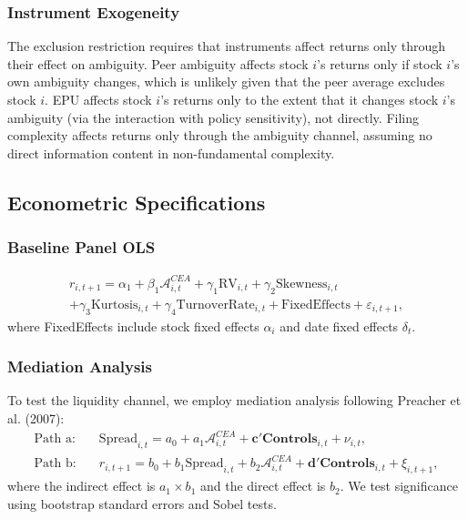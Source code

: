 \documentclass[preprint,12pt,authoryear]{elsarticle}
\begin{document}
\subsubsection{Instrument Exogeneity}
The exclusion restriction requires that instruments affect returns only through their effect on ambiguity. Peer ambiguity affects stock $i$'s returns only if stock $i$'s own ambiguity changes, which is unlikely given that the peer average excludes stock $i$. EPU affects stock $i$'s returns only to the extent that it changes stock $i$'s ambiguity (via the interaction with policy sensitivity), not directly. Filing complexity affects returns only through the ambiguity channel, assuming no direct information content in non-fundamental complexity.

\subsection{Econometric Specifications}

\subsubsection{Baseline Panel OLS}
\begin{equation}
\begin{split}
r_{i,t+1} = \alpha_1 + \beta_1 \mathcal{A}^{CEA}_{i,t} + \gamma_1 \text{RV}_{i,t} + \gamma_2 \text{Skewness}_{i,t} \\
+ \gamma_3 \text{Kurtosis}_{i,t} + \gamma_4 \text{TurnoverRate}_{i,t} + \text{FixedEffects} + \varepsilon_{i,t+1},
\end{split}
\end{equation}
where FixedEffects include stock fixed effects $\alpha_i$ and date fixed effects $\delta_t$.

\subsubsection{Mediation Analysis}
To test the liquidity channel, we employ mediation analysis following Preacher et al. (2007):
\begin{align}
\text{Path a:}\quad & \text{Spread}_{i,t} = a_0 + a_1 \mathcal{A}^{CEA}_{i,t} + \mathbf{c}'\mathbf{Controls}_{i,t} + \nu_{i,t}, \\
\text{Path b:}\quad & r_{i,t+1} = b_0 + b_1 \text{Spread}_{i,t} + b_2 \mathcal{A}^{CEA}_{i,t} + \mathbf{d}'\mathbf{Controls}_{i,t} + \xi_{i,t+1},
\end{align}
where the indirect effect is $a_1 \times b_1$ and the direct effect is $b_2$. We test significance using bootstrap standard errors and Sobel tests.
\end{document}

